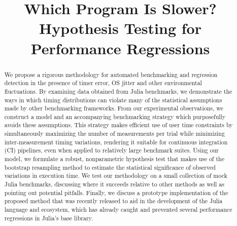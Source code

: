 \documentclass[conference]{IEEEtran}
\begin{document}
\newcommand{\TODO}[1]{\todo[inline]{#1}}
\newcommand{\TODOFIG}[1]{\missingfigure{#1}}

\title{Which Program Is Slower? Hypothesis Testing for Performance Regressions}

\author{
}

\maketitle

\begin{abstract}
We propose a rigorous methodology for automated benchmarking and regression detection in the
presence of timer error, OS jitter and other environmental fluctuations. By examining data
obtained from Julia benchmarks, we demonstrate the ways in which timing distributions can
violate many of the statistical assumptions made by other benchmarking frameworks. From our
experimental observations, we construct a model and an accompanying benchmarking
strategy which purposefully avoids these assumptions. This strategy makes efficient use of
user time constraints by simultaneously maximizing the number of measurements per trial
while minimizing inter-measurement timing variations, rendering it suitable for continuous
integration (CI) pipelines, even when applied to relatively large benchmark suites. Using
our model, we formulate a robust, nonparametric hypothesis test that makes use of the
bootstrap resampling method to estimate the statistical significance of observed variations
in execution time. We test our methodology on a small collection of mock Julia benchmarks,
discussing where it succeeds relative to other methods as well as pointing out potential
pitfalls. Finally, we discuss a prototype implementation of the proposed method that was
recently released to aid in the development of the Julia language and ecosystem, which has
already caught and prevented several performance regressions in Julia's base library.
\end{abstract}
\end{document}
